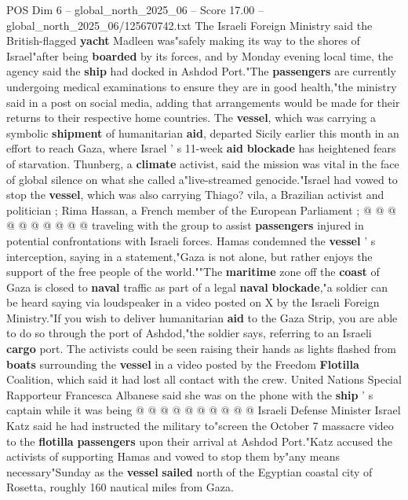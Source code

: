 \begin{textsample}{POS Dim 6 – global\_north\_2025\_06 – Score 17.00 – global\_north\_2025\_06/125670742.txt}  \label{ex:f6_pos_028}
The Israeli Foreign Ministry said the British-flagged \textbf{yacht} Madleen was"safely making its way to the shores of Israel"after being \textbf{boarded} by its forces, and by Monday evening local time, the agency said the \textbf{ship} had docked in Ashdod Port."The \textbf{passengers} are currently undergoing medical examinations to ensure they are in good health,"the ministry said in a post on social media, adding that arrangements would be made for their returns to their respective home countries.
The \textbf{vessel}, which was carrying a symbolic \textbf{shipment} of humanitarian \textbf{aid}, departed Sicily earlier this month in an effort to reach Gaza, where Israel ' s 11-week \textbf{aid} \textbf{blockade} has heightened fears of starvation.
Thunberg, a \textbf{climate} activist, said the mission was vital in the face of global silence on what she called a"live-streamed genocide."Israel had vowed to stop the \textbf{vessel}, which was also carrying Thiago? vila, a Brazilian activist and politician ; Rima Hassan, a French member of the European Parliament ; @ @ @ @ @ @ @ @ @ @ traveling with the group to assist \textbf{passengers} injured in potential confrontations with Israeli forces.
Hamas condemned the \textbf{vessel} ' s interception, saying in a statement,"Gaza is not alone, but rather enjoys the support of the free people of the world.""The \textbf{maritime} zone off the \textbf{coast} of Gaza is closed to \textbf{naval} traffic as part of a legal \textbf{naval} \textbf{blockade},"a soldier can be heard saying via loudspeaker in a video posted on X by the Israeli Foreign Ministry."If you wish to deliver humanitarian \textbf{aid} to the Gaza Strip, you are able to do so through the port of Ashdod,"the soldier says, referring to an Israeli \textbf{cargo} port.
The activists could be seen raising their hands as lights flashed from \textbf{boats} surrounding the \textbf{vessel} in a video posted by the Freedom \textbf{Flotilla} Coalition, which said it had lost all contact with the crew.
United Nations Special Rapporteur Francesca Albanese said she was on the phone with the \textbf{ship} ' s captain while it was being @ @ @ @ @ @ @ @ @ @ Israeli Defense Minister Israel Katz said he had instructed the military to"screen the October 7 massacre video to the \textbf{flotilla} \textbf{passengers} upon their arrival at Ashdod Port."Katz accused the activists of supporting Hamas and vowed to stop them by"any means necessary"Sunday as the \textbf{vessel} \textbf{sailed} north of the Egyptian coastal city of Rosetta, roughly 160 nautical miles from Gaza.

\end{textsample}
